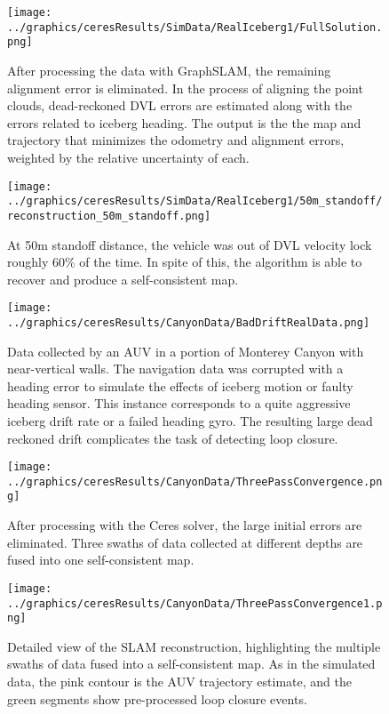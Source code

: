  \begin{figure}[htbp]
   \centering
   \texttt{[image: ../graphics/ceresResults/SimData/RealIceberg1/FullSolution.png]} %
   \caption{After processing the data with GraphSLAM, the remaining alignment error is eliminated. In the process of aligning the point clouds, dead-reckoned DVL errors are estimated along with the errors related to iceberg heading. The output is the the map and trajectory that minimizes the odometry and alignment errors, weighted by the relative uncertainty of each. }
   \label{fig:FullSimSol}
\end{figure}

 \begin{figure}[htbp]
   \centering
   \texttt{[image: ../graphics/ceresResults/SimData/RealIceberg1/50m\_standoff/reconstruction\_50m\_standoff.png]} %
   \caption{At 50m standoff distance, the vehicle was out of DVL velocity lock roughly 60\% of the time. In spite of this, the algorithm is able to recover and produce a self-consistent map.}
   \label{fig:FullSim50m}
\end{figure}

 \begin{figure}[htbp]
   \centering
   \texttt{[image: ../graphics/ceresResults/CanyonData/BadDriftRealData.png]} %
   \caption{Data collected by an AUV in a portion of Monterey Canyon with near-vertical walls. The navigation data was corrupted with a heading error to simulate the effects of iceberg motion or faulty heading sensor. This instance corresponds to a quite aggressive iceberg drift rate or a failed heading gyro. The resulting large dead reckoned drift complicates the task of detecting loop closure.}
   \label{fig:RealDataWithDrift}
\end{figure}

 \begin{figure}[htbp]
   \centering
   \texttt{[image: ../graphics/ceresResults/CanyonData/ThreePassConvergence.png]} %
   \caption{After processing with the Ceres solver, the large initial errors are eliminated. Three swaths of data collected at different depths are fused into one self-consistent map. }
   \label{fig:RealDataSolution1}
\end{figure}

 \begin{figure}[htbp]
   \centering
   \texttt{[image: ../graphics/ceresResults/CanyonData/ThreePassConvergence1.png]} %
   \caption{Detailed view of the SLAM reconstruction, highlighting the multiple swaths of data fused into a self-consistent map. As in the simulated data, the pink contour is the AUV trajectory estimate, and the green segments show pre-processed loop closure events. }
   \label{fig:RealDataSolution1}
\end{figure}

